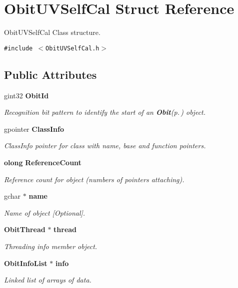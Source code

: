 \section{Obit\-UVSelf\-Cal Struct Reference}
\label{structObitUVSelfCal}
Obit\-UVSelf\-Cal Class structure.  


{\tt \#include $<$Obit\-UVSelf\-Cal.h$>$}

\subsection*{Public Attributes}
\begin{CompactItemize}
\item 
gint32 {\bf Obit\-Id}
\begin{CompactList}\small\item\em Recognition bit pattern to identify the start of an {\bf Obit}{\rm (p.\,\pageref{structObit})} object. \item\end{CompactList}\item 
gpointer {\bf Class\-Info}
\begin{CompactList}\small\item\em Class\-Info pointer for class with name, base and function pointers. \item\end{CompactList}\item 
{\bf olong} {\bf Reference\-Count}
\begin{CompactList}\small\item\em Reference count for object (numbers of pointers attaching). \item\end{CompactList}\item 
gchar $\ast$ {\bf name}
\begin{CompactList}\small\item\em Name of object [Optional]. \item\end{CompactList}\item 
{\bf Obit\-Thread} $\ast$ {\bf thread}
\begin{CompactList}\small\item\em Threading info member object. \item\end{CompactList}\item 
{\bf Obit\-Info\-List} $\ast$ {\bf info}
\begin{CompactList}\small\item\em Linked list of arrays of data. \item\end{CompactList}\item 

\end{CompactItemize}
